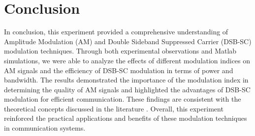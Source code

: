 \documentclass[12pt]{article}
\begin{document}
\section*{Conclusion}
In conclusion, this experiment provided a comprehensive understanding of Amplitude Modulation (AM) and Double Sideband Suppressed Carrier (DSB-SC) modulation techniques. Through both experimental observations and Matlab simulations, we were able to analyze the effects of different modulation indices on AM signals and the efficiency of DSB-SC modulation in terms of power and bandwidth. The results demonstrated the importance of the modulation index in determining the quality of AM signals and highlighted the advantages of DSB-SC modulation for efficient communication. These findings are consistent with the theoretical concepts discussed in the literature \cite{haykin2008communication, proakis2007digital}. Overall, this experiment reinforced the practical applications and benefits of these modulation techniques in communication systems.


\renewcommand{\bibname}{References}

\end{document}

